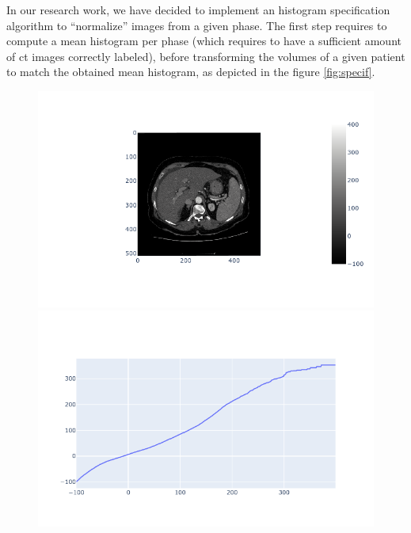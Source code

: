 In our research work, we have decided to implement an histogram
specification algorithm to ``normalize'' images from a given phase. The
first step requires to compute a mean histogram per phase (which requires to
have a sufficient amount of \ac{ct} images correctly labeled), before
transforming the volumes of a given patient to match the obtained mean
histogram, as depicted in the figure \ref{fig:specif}.

\begin{figure}[ht!]
\centering
\begin{minipage}{0.5\linewidth}
\includegraphics[width=\linewidth]{./images/image3.png}
\end{minipage}
\begin{minipage}{0.5\linewidth}
\includegraphics[width=\linewidth]{./images/image1.png}
\end{minipage}
\begin{minipage}{0.5\linewidth}

\end{minipage}
\end{figure}
